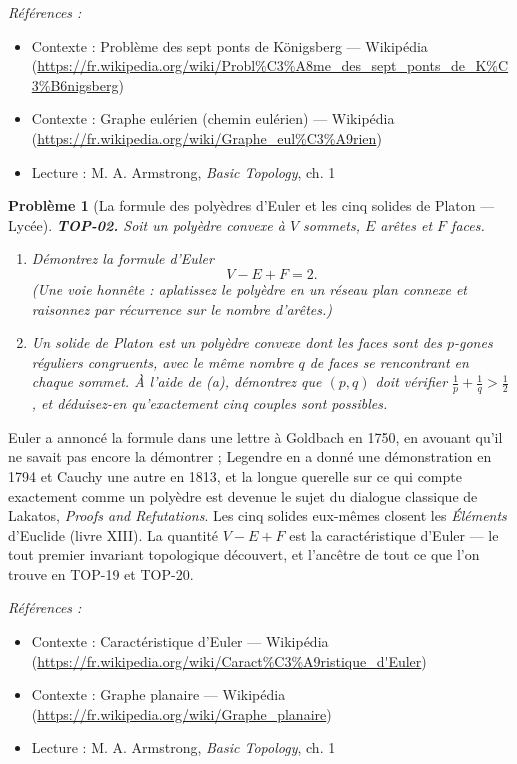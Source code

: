 \documentclass[11pt]{article}
\newtheorem{problem}{Problème}
\newenvironment{refs}{\par\small\noindent\emph{Références :}\begin{itemize}\setlength\itemsep{0pt}}{\end{itemize}\normalsize}
\begin{document}
\begin{refs}
\item Contexte : Problème des sept ponts de Königsberg --- Wikipédia (\url{https://fr.wikipedia.org/wiki/Probl%C3%A8me_des_sept_ponts_de_K%C3%B6nigsberg})
\item Contexte : Graphe eulérien (chemin eulérien) --- Wikipédia (\url{https://fr.wikipedia.org/wiki/Graphe_eul%C3%A9rien})
\item Lecture : M. A. Armstrong, \textit{Basic Topology}, ch. 1
\end{refs}

\bigskip

\begin{problem}[{La formule des polyèdres d'Euler et les cinq solides de Platon --- Lycée}]
\textbf{TOP-02.} Soit un polyèdre convexe à $ V $ sommets, $ E $ arêtes et $ F $
faces.
\begin{enumerate}
\item[(a)] Démontrez la formule d'Euler
\[ V - E + F = 2 . \]
(Une voie honnête : aplatissez le polyèdre en un réseau plan connexe et raisonnez par récurrence sur
le nombre d'arêtes.)
\item[(b)] Un solide de Platon est un polyèdre convexe dont les faces sont des $ p $-gones réguliers
congruents, avec le même nombre $ q $ de faces se rencontrant en chaque sommet. À l'aide de (a),
démontrez que $ (p, q) $ doit vérifier $ \frac{1}{p} + \frac{1}{q} > \frac{1}{2} $, et
déduisez-en qu'exactement cinq couples sont possibles.
\end{enumerate}

\end{problem}

\noindent Euler a annoncé la formule dans une lettre à Goldbach en 1750, en avouant qu'il ne
savait pas encore la démontrer ; Legendre en a donné une démonstration en 1794 et Cauchy une autre en
1813, et la longue querelle sur ce qui compte exactement comme un \og{} polyèdre \fg{} est devenue le sujet du
dialogue classique de Lakatos, \textit{Proofs and Refutations}. Les cinq solides eux-mêmes closent les
\textit{Éléments} d'Euclide (livre XIII). La quantité $ V - E + F $ est la caractéristique d'Euler --- le
tout premier invariant topologique découvert, et l'ancêtre de tout ce que l'on trouve en TOP-19 et
TOP-20.

\begin{refs}
\item Contexte : Caractéristique d'Euler --- Wikipédia (\url{https://fr.wikipedia.org/wiki/Caract%C3%A9ristique_d'Euler})
\item Contexte : Graphe planaire --- Wikipédia (\url{https://fr.wikipedia.org/wiki/Graphe_planaire})
\item Lecture : M. A. Armstrong, \textit{Basic Topology}, ch. 1
\end{refs}
\end{document}
